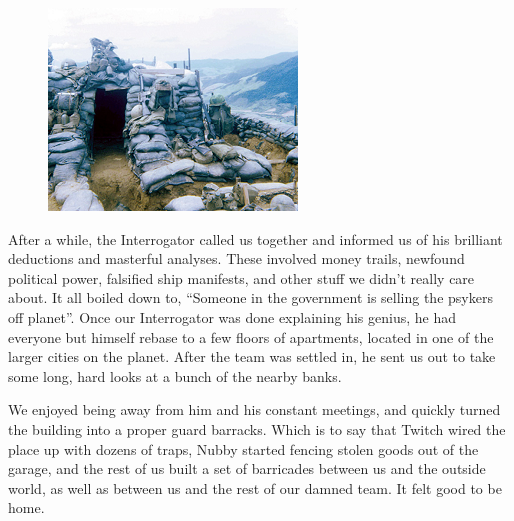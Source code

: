 \begin{figure}
	\begin{center}
		\includegraphics[width=\figwidth]{pics/3/9.png}
	\end{center}
\end{figure}
After a while, the Interrogator called us together and informed us of his brilliant deductions and masterful analyses. 
These involved money trails, newfound political power, falsified ship manifests, and other stuff we didn’t really care about. 
It all boiled down to, “Someone in the government is selling the psykers off planet”. %
Once our Interrogator was done explaining his genius, he had everyone but himself rebase to a few floors of apartments, located in one of the larger cities on the planet. 
After the team was settled in, he sent us out to take some long, hard looks at a bunch of the nearby banks. 

We enjoyed being away from him and his constant meetings, and quickly turned the building into a proper guard barracks. 
Which is to say that Twitch wired the place up with dozens of traps, Nubby started fencing stolen goods out of the garage, and the rest of us built a set of barricades between us and the outside world, as well as between us and the rest of our damned team. 
It felt good to be home.

